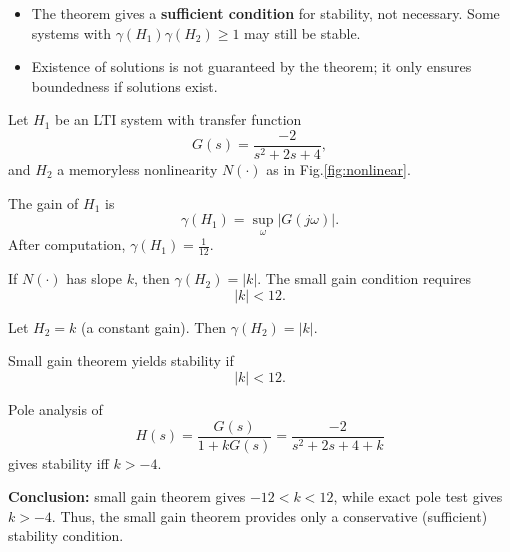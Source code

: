 \begin{remark}
\begin{itemize}
    \item The theorem gives a \textbf{sufficient condition} for stability, not necessary. Some systems with $\gamma(H_1)\gamma(H_2)\geq 1$ may still be stable.
    \item Existence of solutions is not guaranteed by the theorem; it only ensures boundedness if solutions exist.
\end{itemize}
\end{remark}

\begin{example}
Let $H_1$ be an LTI system with transfer function
\begin{equation}
G(s) = \frac{-2}{s^2+2s+4},
\end{equation}
and $H_2$ a memoryless nonlinearity $N(\cdot)$ as in Fig.\ref{fig:nonlinear}.

The gain of $H_1$ is
\begin{equation}
\gamma(H_1) = \sup_{\omega} |G(j\omega)|.
\end{equation}
After computation, $\gamma(H_1) = \tfrac{1}{12}$.

If $N(\cdot)$ has slope $k$, then $\gamma(H_2) = |k|$.  
The small gain condition requires
\begin{equation}
|k| < 12.
\end{equation}

\centering
{}
\label{fig:nonlinear}
\end{example}

\begin{example}
Let $H_2 = k$ (a constant gain). Then $\gamma(H_2)=|k|$.

Small gain theorem yields stability if
\begin{equation}
|k| < 12.
\end{equation}

Pole analysis of
\begin{equation}
H(s) = \frac{G(s)}{1+kG(s)} = \frac{-2}{s^2+2s+4+k}
\end{equation}
gives stability iff $k>-4$.

\textbf{Conclusion:} small gain theorem gives $-12<k<12$, while exact pole test gives $k>-4$. Thus, the small gain theorem provides only a conservative (sufficient) stability condition.
\end{example}

